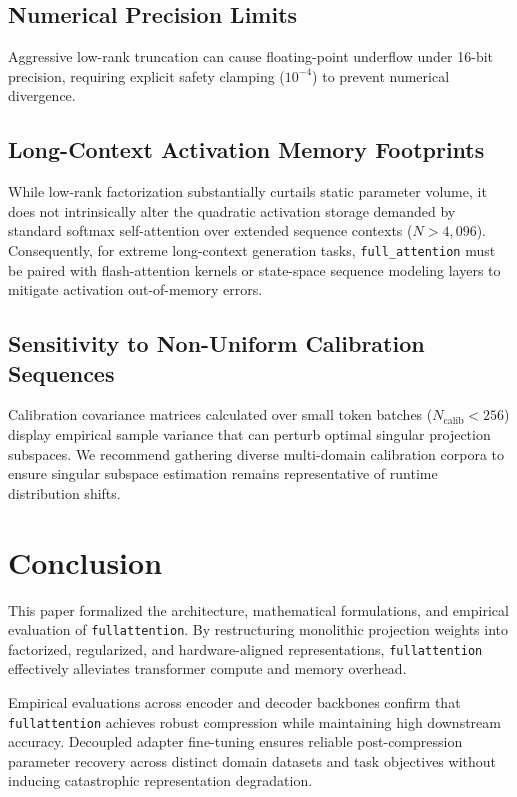 {\subsection{Numerical Precision Limits}
Aggressive low-rank truncation can cause floating-point underflow under 16-bit precision, requiring explicit safety clamping ($10^{-4}$) to prevent numerical divergence.

\subsection{Long-Context Activation Memory Footprints}
While low-rank factorization substantially curtails static parameter volume, it does not intrinsically alter the quadratic activation storage demanded by standard softmax self-attention over extended sequence contexts ($N > 4{,}096$). Consequently, for extreme long-context generation tasks, \texttt{full\_attention} must be paired with flash-attention kernels or state-space sequence modeling layers to mitigate activation out-of-memory errors.

\subsection{Sensitivity to Non-Uniform Calibration Sequences}
Calibration covariance matrices calculated over small token batches ($N_{\text{calib}} < 256$) display empirical sample variance that can perturb optimal singular projection subspaces. We recommend gathering diverse multi-domain calibration corpora to ensure singular subspace estimation remains representative of runtime distribution shifts.


\section{Conclusion}
This paper formalized the architecture, mathematical formulations, and empirical evaluation of \texttt{fullattention}. By restructuring monolithic projection weights into factorized, regularized, and hardware-aligned representations, \texttt{fullattention} effectively alleviates transformer compute and memory overhead.

Empirical evaluations across encoder and decoder backbones confirm that \texttt{fullattention} achieves robust compression while maintaining high downstream accuracy. Decoupled adapter fine-tuning ensures reliable post-compression parameter recovery across distinct domain datasets and task objectives without inducing catastrophic representation degradation.

}
